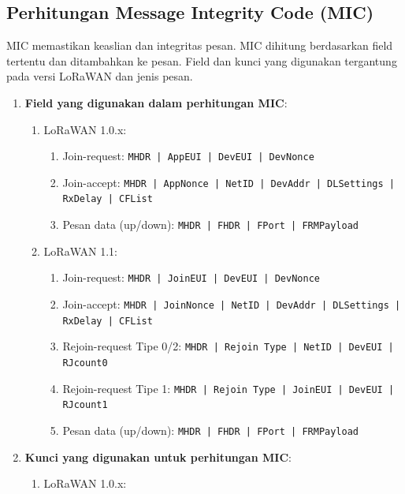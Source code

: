 \subsection{Perhitungan Message Integrity Code (MIC)}
MIC memastikan keaslian dan integritas pesan. MIC dihitung berdasarkan field tertentu dan ditambahkan ke pesan. Field dan kunci yang digunakan tergantung pada versi LoRaWAN dan jenis pesan.
\begin{enumerate}
    \item \textbf{Field yang digunakan dalam perhitungan MIC}:
          \begin{enumerate}
              \item LoRaWAN 1.0.x:
                    \begin{enumerate}
                        \item Join-request: \texttt{MHDR | AppEUI | DevEUI | DevNonce}
                        \item Join-accept: \texttt{MHDR | AppNonce | NetID | DevAddr | DLSettings | RxDelay | CFList}
                        \item Pesan data (up/down): \texttt{MHDR | FHDR | FPort | FRMPayload}
                    \end{enumerate}
              \item LoRaWAN 1.1:
                    \begin{enumerate}
                        \item Join-request: \texttt{MHDR | JoinEUI | DevEUI | DevNonce}
                        \item Join-accept: \texttt{MHDR | JoinNonce | NetID | DevAddr | DLSettings | RxDelay | CFList}
                        \item Rejoin-request Tipe 0/2: \texttt{MHDR | Rejoin Type | NetID | DevEUI | RJcount0}
                        \item Rejoin-request Tipe 1: \texttt{MHDR | Rejoin Type | JoinEUI | DevEUI | RJcount1}
                        \item Pesan data (up/down): \texttt{MHDR | FHDR | FPort | FRMPayload}
                    \end{enumerate}
          \end{enumerate}
    \item \textbf{Kunci yang digunakan untuk perhitungan MIC}:
          \begin{enumerate}
              \item LoRaWAN 1.0.x:
                    \begin{enumerate}

\end{enumerate}
\end{enumerate}
\end{enumerate}
